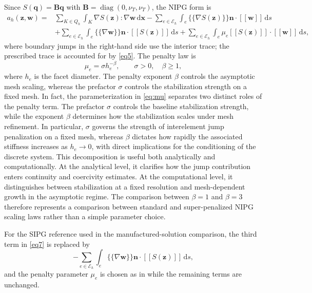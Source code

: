 \documentclass[pdflatex,sn-mathphys-num]{sn-jnl}%
\theoremstyle{thmstyleone}%
\theoremstyle{thmstyletwo}%
\theoremstyle{thmstylethree}%
\begin{document}
Since $S(\mathbf q)=\mathbf B\mathbf q$ with $\mathbf B=\operatorname{diag}(0,\nu_T,\nu_T)$, the NIPG form \cite{ref_article2} is
\begin{equation}
\label{eq7}
\begin{aligned}
a_h(\mathbf z,\mathbf w)
={}&\sum_{K\in Q_h}\int_K\nabla S(\mathbf z):\nabla\mathbf w\,\mathrm d\mathbf x
-\sum_{e\in\mathcal E_h}\int_e\{\!\{\nabla S(\mathbf z)\}\!\}\mathbf n\cdot[[\mathbf w]]\,\mathrm ds\\
&+\sum_{e\in\mathcal E_h}\int_e\{\!\{\nabla\mathbf w\}\!\}\mathbf n\cdot[[S(\mathbf z)]]\,\mathrm ds
+\sum_{e\in\mathcal E_h}\int_e\mu_e[[S(\mathbf z)]]\cdot[[\mathbf w]]\,\mathrm ds,
\end{aligned}
\end{equation}
where boundary jumps in the right-hand side use the interior trace; the prescribed trace is accounted for by \eqref{eq5}. The penalty law is
\begin{equation}
\label{eq:mu}
\mu_e=\sigma h_e^{-\beta},\qquad \sigma>0,\quad \beta\ge1,
\end{equation}
where $h_e$ is the facet diameter. The penalty exponent $\beta$ controls the asymptotic mesh scaling, whereas the prefactor $\sigma$ controls the 
stabilization strength on a fixed mesh.
In fact, the parameterization in \eqref{eq:mu} separates two distinct roles of the penalty term. The prefactor $\sigma$ controls the baseline stabilization 
strength, while the exponent $\beta$ determines how the stabilization scales under mesh refinement. In particular, $\sigma$ governs the strength of 
interelement jump penalization on a fixed mesh, whereas $\beta$ dictates how rapidly the associated stiffness increases as $h_e \to 0$, with direct 
implications for the conditioning of the discrete system.
This decomposition is useful both analytically and computationally. At the analytical level, it clarifies how the jump contribution enters continuity and coercivity estimates. At the computational level, it distinguishes between stabilization at a fixed resolution and mesh-dependent growth in the asymptotic regime. The comparison between $\beta=1$ and $\beta=3$ therefore represents a comparison between standard and super-penalized NIPG scaling laws rather than a simple parameter choice.

For the SIPG reference used in the manufactured-solution comparison, the third term in \eqref{eq7} is replaced by
\[
-\sum_{e\in\mathcal E_h}\int_e\{\!\{\nabla\mathbf w\}\!\}\mathbf n\cdot[[S(\mathbf z)]]\,\mathrm ds,
\]
and the penalty parameter $\mu_e$ is chosen as in \cite{ref_article4} while the remaining terms are unchanged.
\end{document}
